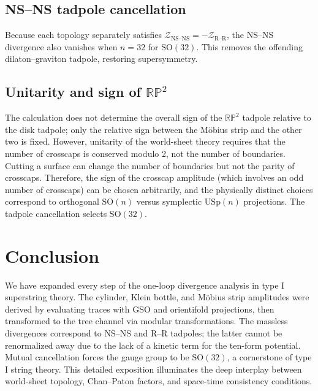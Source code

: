 \documentclass[11pt,a4paper]{article}
\begin{document}
\subsection{NS–NS tadpole cancellation}
Because each topology separately satisfies $\mathcal{Z}_{\text{NS–NS}} = -\mathcal{Z}_{\text{R–R}}$, the NS–NS divergence also vanishes when $n=32$ for $\mathrm{SO}(32)$. This removes the offending dilaton–graviton tadpole, restoring supersymmetry.

\subsection{Unitarity and sign of $\mathbb{RP}^2$}
The calculation does not determine the overall sign of the $\mathbb{RP}^2$ tadpole relative to the disk tadpole; only the relative sign between the M\"obius strip and the other two is fixed. However, unitarity of the world-sheet theory requires that the number of crosscaps is conserved modulo 2, not the number of boundaries. Cutting a surface can change the number of boundaries but not the parity of crosscaps. Therefore, the sign of the crosscap amplitude (which involves an odd number of crosscaps) can be chosen arbitrarily, and the physically distinct choices correspond to orthogonal $\mathrm{SO}(n)$ versus symplectic $\mathrm{USp}(n)$ projections. The tadpole cancellation selects $\mathrm{SO}(32)$.

\section{Conclusion}
We have expanded every step of the one-loop divergence analysis in type I superstring theory. The cylinder, Klein bottle, and M\"obius strip amplitudes were derived by evaluating traces with GSO and orientifold projections, then transformed to the tree channel via modular transformations. The massless divergences correspond to NS–NS and R–R tadpoles; the latter cannot be renormalized away due to the lack of a kinetic term for the ten-form potential. Mutual cancellation forces the gauge group to be $\mathrm{SO}(32)$, a cornerstone of type I string theory. This detailed exposition illuminates the deep interplay between world-sheet topology, Chan–Paton factors, and space-time consistency conditions.

\appendix
\end{document}
